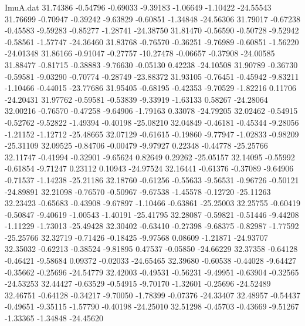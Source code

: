 \begin{filecontents}{ImuA.dat}
  31.74386   -0.54796   -0.69033   -9.39183   -1.06649   -1.10422  -24.55543
  31.76699   -0.70947   -0.39242   -9.63829   -0.60851   -1.34848  -24.56306
  31.79017   -0.67238   -0.45583   -9.59283   -0.85277   -1.28741  -24.38750
  31.81470   -0.56590   -0.50728   -9.52942   -0.58561   -1.57747  -24.36460
  31.83768   -0.76570   -0.36251   -9.76989   -0.60851   -1.56220  -24.01348
  31.86166   -0.91047   -0.27757  -10.27478   -0.06657   -0.37908  -24.00585
  31.88477   -0.81715   -0.38883   -9.76630   -0.05130    0.42238  -24.10508
  31.90789   -0.36730   -0.59581   -9.03290   -0.70774   -0.28749  -23.88372
  31.93105   -0.76451   -0.45942   -9.83211   -1.10466   -0.44015  -23.77686
  31.95405   -0.68195   -0.42353   -9.70529   -1.82216    0.11706  -24.20431
  31.97762   -0.59581   -0.53839   -9.33919   -1.63133    0.58267  -24.28064
  32.00216   -0.76570   -0.47258   -9.64906   -1.79163    0.33078  -24.79205
  32.02462   -0.54915   -0.52762   -9.52822   -1.49394   -0.40198  -25.08210
  32.04849   -0.46181   -0.45344   -9.28056   -1.21152   -1.12712  -25.48665
  32.07129   -0.61615   -0.19860   -9.77947   -1.02833   -0.98209  -25.31109
  32.09525   -0.84706   -0.00479   -9.97927    0.22348   -0.44778  -25.25766
  32.11747   -0.41994   -0.32901   -9.65624    0.82649    0.29262  -25.05157
  32.14095   -0.55992   -0.61854   -9.71247    0.23112    0.10943  -24.97524
  32.16441   -0.61376   -0.37089   -9.64906   -0.71537   -1.14238  -25.21186
  32.18760   -0.61256   -0.55633   -9.56531   -0.96726   -0.50121  -24.89891
  32.21098   -0.76570   -0.50967   -9.67538   -1.45578   -0.12720  -25.11263
  32.23423   -0.65683   -0.43908   -9.67897   -1.10466   -0.63861  -25.25003
  32.25755   -0.60419   -0.50847   -9.40619   -1.00543   -1.40191  -25.41795
  32.28087   -0.59821   -0.51446   -9.44208   -1.11229   -1.73013  -25.49428
  32.30402   -0.63410   -0.27398   -9.68375   -0.82987   -1.77592  -25.25766
  32.32719   -0.71426   -0.18425   -9.97568    0.08609   -1.21871  -24.93707
  32.35032   -0.62213   -0.38524   -9.81895    0.47537   -0.05850  -24.66229
  32.37358   -0.64128   -0.46421   -9.58684    0.09372   -0.02033  -24.65465
  32.39680   -0.60538   -0.44028   -9.64427   -0.35662   -0.25696  -24.54779
  32.42003   -0.49531   -0.56231   -9.49951   -0.63904   -0.32565  -24.53253
  32.44427   -0.63529   -0.54915   -9.70170   -1.32601   -0.25696  -24.52489
  32.46751   -0.64128   -0.34217   -9.70050   -1.78399   -0.07376  -24.33407
  32.48957   -0.54437   -0.49651   -9.35115   -1.57790   -0.40198  -24.25010
  32.51298   -0.45703   -0.43669   -9.51267   -1.33365   -1.34848  -24.45620

\end{filecontents}
